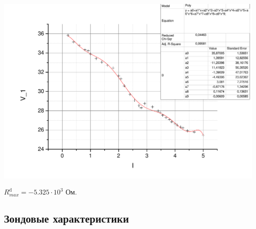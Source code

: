 \documentclass[a4paper,12pt]{article}
\newcommand{\dif}{\mathrm{d}}
\begin{document}
		\includegraphics[width = \linewidth]{graph1}
		
		$R^\dif_{max} = -5.325\cdot10^{3}$ Ом.
		
		
		\subsection{Зондовые характеристики}
		
\end{document}
